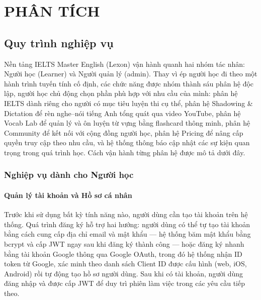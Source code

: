 \chapter{PHÂN TÍCH}
\thispagestyle{mainstyle}

\section{Quy trình nghiệp vụ}

Nền tảng IELTS Master English (Lexon) vận hành quanh hai nhóm tác nhân: Người học (Learner) và Người quản lý (admin). Thay vì ép người học đi theo một hành trình tuyến tính cố định, các chức năng được nhóm thành sáu phân hệ độc lập, người học chủ động chọn phần phù hợp với nhu cầu của mình: phân hệ IELTS dành riêng cho người có mục tiêu luyện thi cụ thể, phân hệ Shadowing \& Dictation để rèn nghe--nói tiếng Anh tổng quát qua video YouTube, phân hệ Vocab Lab để quản lý và ôn luyện từ vựng bằng flashcard thông minh, phân hệ Community để kết nối với cộng đồng người học, phân hệ Pricing để nâng cấp quyền truy cập theo nhu cầu, và hệ thống thông báo cập nhật các sự kiện quan trọng trong quá trình học. Cách vận hành từng phân hệ được mô tả dưới đây.

\subsection{Nghiệp vụ dành cho Người học}

\subsubsection{Quản lý tài khoản và Hồ sơ cá nhân}
Trước khi sử dụng bất kỳ tính năng nào, người dùng cần tạo tài khoản trên hệ thống. Quá trình đăng ký hỗ trợ hai hướng: người dùng có thể tự tạo tài khoản bằng cách cung cấp địa chỉ email và mật khẩu --- hệ thống băm mật khẩu bằng bcrypt và cấp JWT ngay sau khi đăng ký thành công --- hoặc đăng ký nhanh bằng tài khoản Google thông qua Google OAuth, trong đó hệ thống nhận ID token từ Google, xác minh theo danh sách Client ID được cấu hình (web, iOS, Android) rồi tự động tạo hồ sơ người dùng. Sau khi có tài khoản, người dùng đăng nhập và được cấp JWT để duy trì phiên làm việc trong các yêu cầu tiếp theo.

